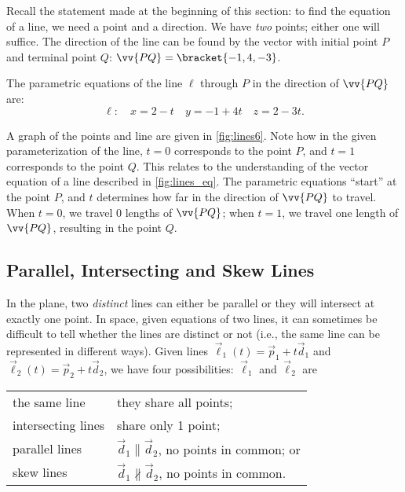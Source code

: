 {Recall the statement made at the beginning of this section: to find the equation of a line, we need a point and a direction. We have \emph{two} points; either one will suffice. The direction of the line can be found by the vector with initial point $P$ and terminal point $Q$: $\vv{PQ} =\bracket{-1,4,-3}$.

The parametric equations of the line $\ell$ through $P$ in the direction of $\vv{PQ}$ are:
\[\ell: \quad x= 2-t\quad y=-1+4t \quad z=2-3t.\]


A graph of the points and line are given in \autoref{fig:lines6}. Note how in the given parameterization of the line, $t=0$ corresponds to the point $P$, and $t=1$ corresponds to the point $Q$. This relates to the understanding of the vector equation of a line described in \autoref{fig:lines_eq}. The parametric equations ``start'' at the point $P$, and $t$ determines how far in the direction of $\vv{PQ}$ to travel. When $t=0$, we travel 0 lengths of $\vv{PQ}$; when $t=1$, we travel one length of $\vv{PQ}$, resulting in the point $Q$.}

\subsection{Parallel, Intersecting and Skew Lines}

In the plane, two \emph{distinct} lines can either be parallel or they will intersect at exactly one point. In space, given equations of two lines, it can sometimes be difficult to tell whether the lines are distinct or not (i.e., the same line can be represented in different ways). Given lines $\vec\ell_1(t) = \vec p_1 + t\vec d_1$ and $\vec \ell_2(t) = \vec p_2+t\vec d_2$, we have four possibilities: $\vec \ell_1$ and $\vec \ell_2$ are
\begin{center}
\begin{tabular}{p{100pt}p{150pt}}
the same line & they share all points; \\
intersecting lines & share only 1 point;\\
parallel lines & $\vec d_1\parallel \vec d_2$, no points in common; or \\
skew lines & $\vec d_1\nparallel \vec d_2$, no points in common. 
\end{tabular}
\end{center}

